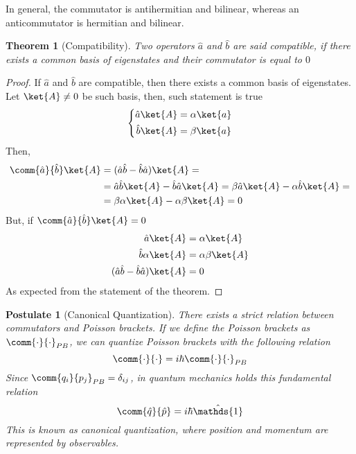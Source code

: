 \documentclass[a4paper, 11pt]{book}
\newcommand{\1}{\opr{\mathds{1}}}
\newcommand{\opr}[1]{\hat{#1}}
\newtheorem{pos}{Postulate}
\newtheorem{thm}{Theorem}
\theoremstyle{plain}
\begin{document}
	In general, the commutator is antihermitian and bilinear, whereas an anticommutator is hermitian and bilinear.\\
	\begin{thm}[Compatibility]
		Two operators $\opr{a}$ and $\opr{b}$ are said compatible, if there exists a common basis of eigenstates and their commutator is equal to $0$
		\label{thm:comp}
	\end{thm}
	\begin{proof}
		If $\opr{a}$ and $\opr{b}$ are compatible, then there exists a common basis of eigenstates. Let $\ket{A}\ne0$ be such basis, then, such statement is true
		\begin{equation}
			\left\{\begin{aligned}
					\opr{a}\ket{A}&=\alpha\ket{a}\\
					\opr{b}\ket{A}&=\beta\ket{a}
			\end{aligned}\right.
			\label{eq:comp1}
		\end{equation}
		Then,
		\begin{equation}
			\begin{aligned}
				\comm{\opr{a}}{\opr{b}}\ket{A}&=(\opr{a}\opr{b}-\opr{b}\opr{a})\ket{A}=\\
				&=\opr{a}\opr{b}\ket{A}-\opr{b}\opr{a}\ket{A}=\beta\opr{a}\ket{A}-\alpha\opr{b}\ket{A}=\\
				&=\beta\alpha\ket{A}-\alpha\beta\ket{A}=0
			\end{aligned}
			\label{eq:comp1d}
		\end{equation}
		But, if $\comm{\opr{a}}{\opr{b}}\ket{A}=0$
		\begin{equation}
			\begin{aligned}
				\opr{a}\ket{A}&=\alpha\ket{A}\\
				\opr{b}\alpha\ket{A}&=\alpha\beta\ket{A}\\
				(\opr{a}\opr{b}-\opr{b}\opr{a})\ket{A}&=0
			\end{aligned}
			\label{eq:comp2}
		\end{equation}
		As expected from the statement of the theorem.
	\end{proof}
	\begin{pos}[Canonical Quantization]
		\label{pos:canquant}
		There exists a strict relation between commutators and Poisson brackets. If we define the Poisson brackets as $\comm{\cdot}{\cdot}_{PB}$, we can quantize Poisson brackets with the following relation
		\begin{equation*}
			\comm{\cdot}{\cdot}=i\hbar\comm{\cdot}{\cdot}_{PB}
		\end{equation*}
		Since $\comm{q_i}{p_j}_{PB}=\delta_{ij}$, in quantum mechanics holds this fundamental relation
		\begin{equation}
			\comm{\opr{q}}{\opr{p}}=i\hbar\1
			\label{eq:canonical quantization}
		\end{equation}
		This is known as canonical quantization, where position and momentum are represented by observables.
	\end{pos}
\end{document}
